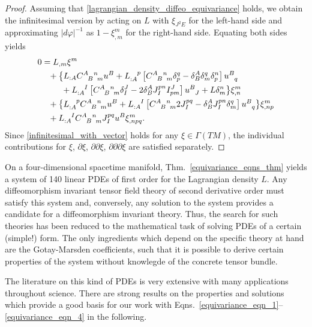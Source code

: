 \begin{proof}
  Assuming that \eqref{lagrangian_density_diffeo_equivariance} holds, we obtain the infinitesimal version by acting on $L$ with $\xi_{J^2E}$ for the left-hand side and approximating $\lvert d\varphi\rvert^{-1}$ as $1 - \xi^m_{,m}$ for the right-hand side. Equating both sides yields
  \begin{equation}\label{infinitesimal_with_vector}
    \begin{aligned}
      0 &{} = L_{,m} \xi^m \\
        &{} \hphantom{=} + \big\{ L_{:A} \gmc{A}{B}{n}{m}u^B + L_{:A}^{\hphantom{:A}p}\left\lbrack\gmc{A}{B}{n}{m} \delta^q_p - \delta^A_B\delta^q_m\delta^n_p\right\rbrack u^{B}_{\hphantom Bq} \\
        &{} \hphantom{=+\{} + L_{:A}^{\hphantom{:A}I} \left\lbrack\gmc{A}{B}{n}{m} \delta^J_I - 2 \delta^A_B J^{pn}_{I} I^J_{pm}\right\rbrack u^B_{\hphantom BJ} + L\delta^n_m \big\} \xi^m_{,n} \\
        &{} \hphantom{=} + \big\{ L_{:A}^{\hphantom{:A}p} \gmc{A}{B}{n}{m} u^B + L_{:A}^{\hphantom{:A}I}\left\lbrack\gmc{A}{B}{n}{m} 2J^{pq}_I - \delta^A_B J^{pn}_I \delta^q_m\right\rbrack u^B_{\hphantom Bq} \big\} \xi^m_{,np} \\
        &{} \hphantom{=} + L_{:A}^{\hphantom{:A}I} \gmc{A}{B}{n}{m} J^{pq}_I u^B \xi^m_{,npq}.
    \end{aligned}
  \end{equation}
Since \eqref{infinitesimal_with_vector} holds for any $\xi\in\Gamma(TM)$, the individual contributions for $\xi$, $\partial\xi$, $\partial\partial\xi$, $\partial\partial\partial\xi$ are satisfied separately.
\end{proof}

On a four-dimensional spacetime manifold, Thm.~\ref{equivariance_eqns_thm} yields a system of 140 linear PDEs of first order for the Lagrangian density $L$. Any diffeomorphism invariant tensor field theory of second derivative order must satisfy this system and, conversely, any solution to the system provides a candidate for a diffeomorphism invariant theory. Thus, the search for such theories has been reduced to the mathematical task of solving PDEs of a certain (simple!) form. The only ingredients which depend on the specific theory at hand are the Gotay-Marsden coefficients, such that it is possible to derive certain properties of the system without knowlegde of the concrete tensor bundle.

The literature on this kind of PDEs is very extensive\cite{} with many applications throughout science\cite{}. There are strong results on the properties and solutions which provide a good basis for our work with Eqns.~\ref{equivariance_eqn_1}--\ref{equivariance_eqn_4} in the following.

